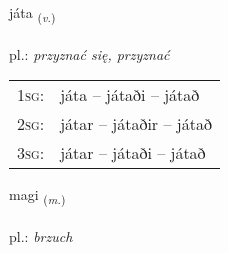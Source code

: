 \documentclass[frontgrid, backgrid]{flacards}\usepackage[]{graphicx}\usepackage[]{xcolor}
\begin{document}
\renewcommand{\flhead}{\vskip5pt \fboxsep=0pt {\small\bfseries\footnotesize Sagnorð | Verb}}
\renewcommand{\fcfoot}{\vskip5pt \fboxsep=0pt \hspace{2pt}{\small\bfseries\footnotesize 2K}}

\renewcommand{\blhead}{\vskip5pt {\small\bfseries\footnotesize Sagnorð | Verb }}
\renewcommand{\bcfoot}{\vskip5pt \hspace{2pt}{\small\bfseries\footnotesize 2K}}


{játa \small{\textsubscript{(\textit{v.})}} \\[1ex] %
\textphonetic{[jauːta]} \\
pl.: \emph{przyznać się, przyznać} \\  [2ex]
\renewcommand*{\arraystretch}{0.8}
\begin{tabular}{p{1cm}l}
\textsc{1sg}: & játa -- játaði -- játað \\ 
\textsc{2sg}: & játar -- játaðir -- játað \\ 
\textsc{3sg}: & játar -- játaði -- játað \\ 
\end{tabular}
}

\renewcommand{\flhead}{\vskip5pt \fboxsep=0pt {\small\bfseries\footnotesize Nafnorð | Noun}}
\renewcommand{\fcfoot}{\vskip5pt \fboxsep=0pt \hspace{2pt}{\small\bfseries\footnotesize 2K}}

\renewcommand{\blhead}{\vskip5pt {\small\bfseries\footnotesize Nafnorð | Noun }}
\renewcommand{\bcfoot}{\vskip5pt \hspace{2pt}{\small\bfseries\footnotesize 2K}}


{magi \small{\textsubscript{(\textit{m.})}} \\[1ex] %
\textphonetic{[maijɪ]} \\
pl.: \emph{brzuch} \\  [2ex]
\renewcommand*{\arraystretch}{0.8}
}
\end{document}
